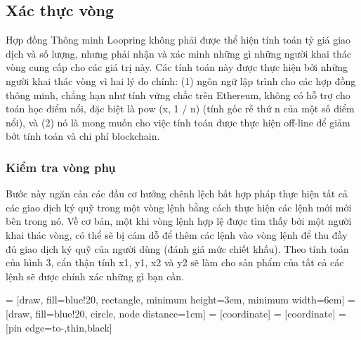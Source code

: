 \documentclass[12pt,a4paper]{article}
\makeatletter
\newenvironment{figurehere}
 {\def\@captype{figure}}
 {}
\makeatother
\begin{document}
\begin{multicols}{2}
\subsection{Xác thực vòng\label{sec:ring_verification}}
Hợp đồng Thông minh Loopring không phải được thể hiện tính toán tỷ giá giao dịch và số lượng, nhưng phải nhận và xác minh những gì những người khai thác vòng cung cấp cho các giá trị này. Các tính toán này được thực hiện bởi những người khai thác vòng vì hai lý do chính: (1) ngôn ngữ lập trình cho các hợp đồng thông minh, chẳng hạn như tính vững chắc \cite{schuh2015bitshares} trên Ethereum, không có hỗ trợ cho toán học điểm nổi, đặc biệt là pow (x, 1 / n) (tính gốc rễ thứ n của một số điểm nổi), và (2) nó là mong muốn cho việc tính toán được thực hiện off-line để giảm bớt tính toán và chi phí blockchain.

\subsubsection{Kiểm tra vòng phụ \label{sec:sub_ring_check}}
Bước này ngăn cản các đầu cơ hưởng chênh lệch bất hợp pháp thực hiện tất cả các giao dịch ký quỹ trong một vòng lệnh bằng cách thực hiện các lệnh mới mới bên trong nó. Về cơ bản, một khi vòng lệnh hợp lệ được tìm thấy bởi một người khai thác vòng, có thể sẽ bị cám dỗ để thêm các lệnh vào vòng lệnh để thu đầy đủ giao dịch ký quỹ của người dùng (đánh giá mức chiết khấu). Theo tính toán của hình 3, cẩn thận tính x1, y1, x2 và y2 sẽ làm cho sản phẩm của tất cả các lệnh sẽ được chính xác những gì bạn cần.
\begin{center}
\begin{figurehere}
\centering
{} = [draw, fill=blue!20, rectangle,
    minimum height=3em, minimum width=6em]
 = [draw, fill=blue!20, circle, node distance=1cm]
 = [coordinate]
 = [coordinate]
 = [pin edge={to-,thin,black}]

\end{figurehere}
\end{center}
\end{multicols}
\end{document}
